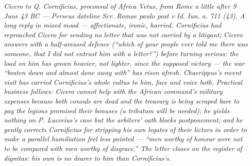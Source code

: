 
\textit{Cicero to Q. Cornificius, proconsul of Africa Vetus, from Rome a little
after 9 June 43 BC --- Perseus dateline \textit{Scr. Romae paulo post v Id. Iun.
a. 711 (43)}. A long reply in mixed mood --- affectionate, ironic, harried.
Cornificius had reproached Cicero for sending no letter that was not carried by
a litigant; Cicero answers with a half-amused defence (``which of your people
ever told me there was someone, that I did not entrust him with a letter?'')
before turning serious: the load on him has grown heavier, not lighter, since
the supposed victory --- the war ``beaten down and almost done away with'' has
risen afresh. Chaerippus's recent visit has carried Cornificius's whole
\emph{vultus} to him, face and voice both. Practical business follows: Cicero
cannot help with the African command's military expenses because both consuls
are dead and the treasury is being scraped bare to pay the legions promised
their bonuses (a \emph{tributum} will be needed); he yields nothing on
P. Lucceius's case but the arbiters' oath blocks postponement; and he gently
corrects Cornificius for stripping his own legates of their lictors in order to
make a parallel humiliation feel less pointed --- ``men worthy of honour were
not to be compared with men worthy of disgrace.'' The letter closes on the
register of \emph{dignitas}: his own is no dearer to him than Cornificius's.}
